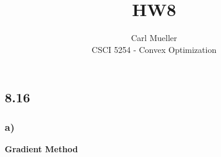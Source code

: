\documentclass[12pt]{article}
\begin{document}
 
 
 
\title{HW8}
\author{Carl Mueller\\ %
CSCI 5254 - Convex Optimization} %
\maketitle

\subsection*{8.16}
\subsubsection*{a)}
\textbf{Gradient Method}
\end{document}
